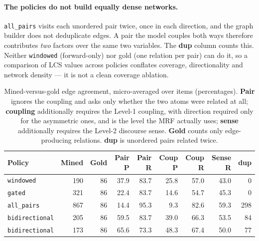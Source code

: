 \documentclass[11pt]{article}
\begin{document}
\paragraph{The policies do not build equally dense networks.} \texttt{all\_pairs} visits each unordered pair twice, once in each direction, and the graph builder does not deduplicate edges. A pair the model couples both ways therefore contributes \emph{two} factors over the same two variables. The \textbf{dup} column counts this. Neither \texttt{windowed} (forward-only) nor gold (one relation per pair) can do it, so a comparison of LCS values across policies conflates coverage, directionality and network density --- it is not a clean coverage ablation.

\begin{table}[htbp]
\centering
\small
\caption{Mined-versus-gold edge agreement, micro-averaged over items (percentages). \textbf{Pair} ignores the coupling and asks only whether the two atoms were related at all; \textbf{coupling} additionally requires the Level-1 coupling, with direction required only for the asymmetric ones, and is the level the MRF actually uses; \textbf{sense} additionally requires the Level-2 discourse sense. \textbf{Gold} counts only edge-producing relations. \textbf{dup} is unordered pairs related twice.}
\label{tab:mining-pr}
\begin{tabular}{lrrrrrrrr}
\toprule
Policy & Mined & Gold & Pair P & Pair R & Coup P & Coup R & Sense R & dup \\
\midrule
\texttt{windowed} & 190 & 86 & 37.9 & 83.7 & 25.8 & 57.0 & 43.0 & 0 \\
\texttt{gated} & 321 & 86 & 22.4 & 83.7 & 14.6 & 54.7 & 45.3 & 0 \\
\texttt{all\_pairs} & 867 & 86 & 14.4 & 95.3 & 9.3 & 82.6 & 59.3 & 298 \\
\texttt{bidirectional} & 205 & 86 & 59.5 & 83.7 & 39.0 & 66.3 & 53.5 & 84 \\
\texttt{bidirectional} & 173 & 86 & 65.6 & 73.3 & 48.3 & 67.4 & 50.0 & 77 \\
\bottomrule
\end{tabular}
\end{table}
\end{document}
